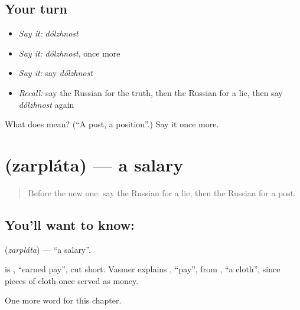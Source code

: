 \subsection*{Your turn}
\begin{itemize}
\raggedright
  \item \emph{Say it:} \emph{dólzhnost}
  \item \emph{Say it:} \emph{dólzhnost}, once more
  \item \emph{Say it:} say \emph{dólzhnost}
  \item \emph{Recall:} say the Russian for the truth, then the Russian for a lie, then say \emph{dólzhnost} again
\end{itemize}

\begin{tcolorbox}[breakable,colback=teal!4,colframe=teal!35!black,title={Before you move on}]
What does  mean? (\textquotedblleft{}A post, a position\textquotedblright{}.) Say it once more.
\end{tcolorbox}
\section[\texorpdfstring{\ru{зарплата} (zarpláta)}{зарплата (zarpláta)}]{ (zarpláta) — a salary}

\label{lesson:RU-C170-zarplata}



\begin{quote}
Before the new one: say the Russian for a lie, then the Russian for a post.
\end{quote}

\subsection*{You'll want to know: }
\textbf{} (\emph{zarpláta}) — \textquotedblleft{}a salary\textquotedblright{}.

\begin{cousinweb}
\textbf{} is \emph{ }, \textquotedblleft{}earned pay\textquotedblright{}, cut short. Vasmer explains \emph{}, \textquotedblleft{}pay\textquotedblright{}, from \emph{}, \textquotedblleft{}a cloth\textquotedblright{}, since pieces of cloth once served as money.
\end{cousinweb}

\begin{grammarlens}[title={What you've built}]
One more word for this chapter.
\end{grammarlens}

